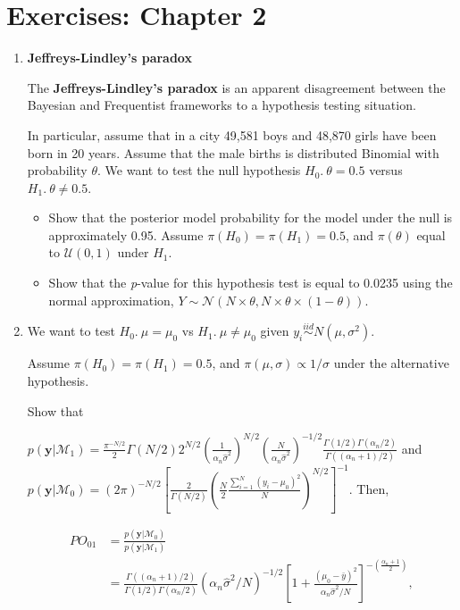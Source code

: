 \section{Exercises: Chapter 2}\label{sec28}
\begin{enumerate}
\item \textbf{Jeffreys-Lindley's paradox}

The \textbf{Jeffreys-Lindley's paradox} \cite{Jeffreys1961,lindley1957statistical} is an apparent disagreement between the Bayesian and Frequentist frameworks to a hypothesis testing situation.

In particular, assume that in a city 49,581 boys and 48,870 girls have been born in 20 years. Assume that the male births is distributed Binomial with probability $\theta$. We want to test the null hypothesis $H_0. \ \theta=0.5$ versus $H_1. \ \theta\neq 0.5$.

\begin{itemize}
	\item Show that the posterior model probability for the model under the null is approximately 0.95. Assume $\pi(H_0)=\pi(H_1)=0.5$, and $\pi(\theta)$ equal to $\mathcal{U}(0,1)$ under $H_1$.
	\item Show that the \textit{p}-value for this hypothesis test is equal to 0.0235 using the normal approximation, $Y\sim \mathcal{N}(N\times \theta, N\times \theta \times (1-\theta))$. 
\end{itemize}

\item We want to test $H_0. \ \mu=\mu_0$ vs $H_1. \ \mu \neq \mu_0$ given $y_i\stackrel{iid}{\sim}N(\mu,\sigma^2)$.

Assume $\pi(H_0)=\pi(H_1)=0.5$, and $\pi(\mu,\sigma)\propto 1/\sigma$ under the alternative hypothesis.

Show that

$p(\mathbf{y}|\mathcal{M}_1)=\frac{\pi^{-N/2}}{2}\Gamma(N/2)2^{N/2}\left(\frac{1}{\alpha_n\hat{\sigma}^2}\right)^{N/2}\left(\frac{N}{\alpha_n\hat{\sigma}^2}\right)^{-1/2}\frac{\Gamma(1/2)\Gamma(\alpha_n/2)}{\Gamma((\alpha_n+1)/2)}$ and $p(\mathbf{y}|\mathcal{M}_0)=(2\pi)^{-N/2}\left[\frac{2}{\Gamma(N/2)}\left(\frac{N}{2}\frac{\sum_{i=1}^N(y_i-\mu_0)^2}{N}\right)^{N/2}\right]^{-1}$. Then,

\begin{align*}
	PO_{01}&=\frac{p(\mathbf{y}|\mathcal{M}_0)}{p(\mathbf{y}|\mathcal{M}_1)}\\
	& =\frac{\Gamma((\alpha_n+1)/2)}{\Gamma(1/2)\Gamma(\alpha_n/2)}(\alpha_n\hat{\sigma}^2/N)^{-1/2}\left[1+\frac{(\mu_0-\bar{y})^2}{\alpha_n\hat{\sigma}^2/N}\right]^{-\left(\frac{\alpha_n+1}{2}\right)},
\end{align*}


\end{enumerate}

